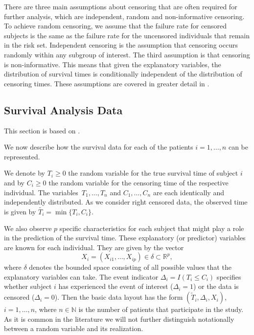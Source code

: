\documentclass[12pt, a4paper]{scrartcl}
\theoremstyle{definition}
\theoremstyle{plain}
\numberwithin{equation}{section}
\numberwithin{figure}{section}
\numberwithin{table}{section}
\begin{document}
	There are three main assumptions about censoring that are often required for further analysis, which are independent, random and non-informative censoring.
	To achieve random censoring, we assume that the failure rate for censored subjects is the same as the failure rate for the uncensored individuals that remain in the risk set.
	Independent censoring is the assumption that censoring occurs randomly within any subgroup of interest.
	The third assumption is that censoring is non-informative.
	This means that given the explanatory variables, the distribution of survival times is conditionally independent of the distribution of censoring times.
	These assumptions are covered in greater detail in \citet*{bookfailuretime}.
	
	
	\subsection{Survival Analysis Data} \label{sabasics}
	
	This section is based on \citet*{sabook}.
	
	We now describe how the survival data for each of the patients $i = 1, \dots, n$ can be represented.
	
	We denote by $T_i \geq 0$ the random variable for the true survival time of subject $i$ and by $C_i \geq 0$ the random variable for the censoring time of the respective individual.
	The variables~$T_1,\dots,T_n$ and $C_1,\dots,C_n$ are each identically and independently distributed.
	As we consider right censored data, the observed time is given by $\tilde{T_i} = \min\{T_i,C_i\}$.
	
	We also observe $p$ specific characteristics for each subject that might play a role in the prediction of the survival time.
	These explanatory (or predictor) variables are known for each individual.
	They are given by the vector $$X_i = (X_{i1}, \dots , X_{ip}) \in \delta \subset \mathbb{R}^p,$$ where $\delta$ denotes the bounded space consisting of all possible values that the explanatory variables can take.
	The event indicator $\Delta_i = I(T_i \leq C_i)$ specifies whether subject $i$ has experienced the event of interest ($\Delta_i=1$) or the data is censored ($\Delta_i=0$).
	Then the basic data layout has the form $(\tilde{T}_i, \Delta_i, X_i)$, $i = 1, \dots , n$, where $n \in \mathbb{N}$ is the number of patients that participate in the study.
	As it is common in the literature we will not further distinguish notationally between a random variable and its realization.
	
\end{document}
